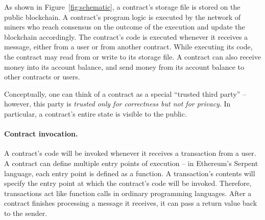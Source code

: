 \documentclass[10pt,twocolumn,letterpaper]{article}
\begin{document}
As shown in Figure~\ref{fig:schematic}, a contract's storage file is stored on the public blockchain.
A contract's program logic is executed by the network of miners 
who reach consensus on the outcome of the execution  
and update the blockchain accordingly.
The contract's code is executed whenever it receives a message, 
either from a user or from another contract.
While executing its code, the contract may read from or write to its storage file.
A contract can also receive money into its account balance, and send money from its account balance to other contracts or users.




Conceptually, one can think of a contract as 
a special ``trusted third party'' -- however,
this party is {\it trusted only for correctness but not for privacy}.
In particular, a contract's entire state is 
visible to the public.

\paragraph{Contract invocation.} 
A contract's code will be invoked 
whenever it receives a transaction from a user.
A contract can define multiple entry points
of execution -- in Ethereum's Serpent language,
each entry point is defined as a function.
A transaction's contents
will specify the entry point 
at which the contract's code will be invoked.
Therefore, transactions act like function calls in ordinary programming languages. 
After a contract finishes processing a message it receives, it can pass a return value back to the sender.
\end{document}
